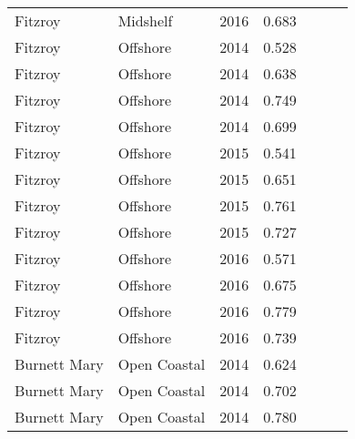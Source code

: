 {\begin{longtable}{llccccc}
  Fitzroy & Midshelf & 2016 & 0.683 & \cellcolor[HTML]{B0D235}{B} & \cellcolor[HTML]{B0D235}{B} & \cellcolor[HTML]{B0D235}{B} \\ 
  Fitzroy & Offshore & 2014 & 0.528 & \cellcolor[HTML]{F0C918}{C} & \cellcolor[HTML]{F0C918}{C} & \cellcolor[HTML]{F0C918}{C} \\ 
  Fitzroy & Offshore & 2014 & 0.638 & \cellcolor[HTML]{F0C918}{C} & \cellcolor[HTML]{B0D235}{B} & \cellcolor[HTML]{F0C918}{C} \\ 
  Fitzroy & Offshore & 2014 & 0.749 & \cellcolor[HTML]{B0D235}{B} & \cellcolor[HTML]{B0D235}{B} & \cellcolor[HTML]{B0D235}{B} \\ 
  Fitzroy & Offshore & 2014 & 0.699 & \cellcolor[HTML]{B0D235}{B} & \cellcolor[HTML]{B0D235}{B} & \cellcolor[HTML]{B0D235}{B} \\ 
  Fitzroy & Offshore & 2015 & 0.541 & \cellcolor[HTML]{F0C918}{C} & \cellcolor[HTML]{F0C918}{C} & \cellcolor[HTML]{F0C918}{C} \\ 
  Fitzroy & Offshore & 2015 & 0.651 & \cellcolor[HTML]{F0C918}{C} & \cellcolor[HTML]{B0D235}{B} & \cellcolor[HTML]{B0D235}{B} \\ 
  Fitzroy & Offshore & 2015 & 0.761 & \cellcolor[HTML]{B0D235}{B} & \cellcolor[HTML]{B0D235}{B} & \cellcolor[HTML]{B0D235}{B} \\ 
  Fitzroy & Offshore & 2015 & 0.727 & \cellcolor[HTML]{B0D235}{B} & \cellcolor[HTML]{B0D235}{B} & \cellcolor[HTML]{B0D235}{B} \\ 
  Fitzroy & Offshore & 2016 & 0.571 & \cellcolor[HTML]{F0C918}{C} & \cellcolor[HTML]{F0C918}{C} & \cellcolor[HTML]{F0C918}{C} \\ 
  Fitzroy & Offshore & 2016 & 0.675 & \cellcolor[HTML]{B0D235}{B} & \cellcolor[HTML]{B0D235}{B} & \cellcolor[HTML]{B0D235}{B} \\ 
  Fitzroy & Offshore & 2016 & 0.779 & \cellcolor[HTML]{B0D235}{B} & \cellcolor[HTML]{B0D235}{B} & \cellcolor[HTML]{B0D235}{B} \\ 
  Fitzroy & Offshore & 2016 & 0.739 & \cellcolor[HTML]{B0D235}{B} & \cellcolor[HTML]{B0D235}{B} & \cellcolor[HTML]{B0D235}{B} \\ 
  Burnett Mary & Open Coastal & 2014 & 0.624 & \cellcolor[HTML]{F0C918}{C} & \cellcolor[HTML]{B0D235}{B} & \cellcolor[HTML]{F0C918}{C} \\ 
  Burnett Mary & Open Coastal & 2014 & 0.702 & \cellcolor[HTML]{B0D235}{B} & \cellcolor[HTML]{B0D235}{B} & \cellcolor[HTML]{B0D235}{B} \\ 
  Burnett Mary & Open Coastal & 2014 & 0.780 & \cellcolor[HTML]{B0D235}{B} & \cellcolor[HTML]{B0D235}{B} & \cellcolor[HTML]{B0D235}{B} \\ 

\end{longtable}}
